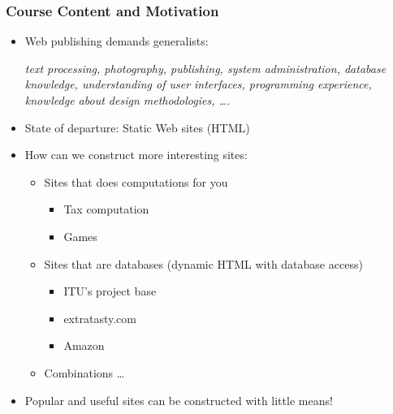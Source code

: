 \documentclass[dvipsnames]{beamer}
\begin{document}
\begin{frame}
\frametitle{Course Content and Motivation}

\begin{itemize}
\item Web publishing demands generalists:
  
  \begin{small}
      \textit{text processing, photography, publishing, system administration,
      database knowledge, understanding of user interfaces,
      programming experience, knowledge about design methodologies,
      \ldots.}
  \end{small}
\item State of departure: Static Web sites (HTML)


\item How can we construct more interesting sites:
\begin{itemize}
\item Sites that does computations for you
  \begin{itemize}
  \item Tax computation
  \item Games
  \end{itemize}
\item Sites that are databases (dynamic HTML with database access)
  \begin{itemize}
  \item ITU's project base
  \item extratasty.com
  \item Amazon 
  \end{itemize}
\item Combinations \ldots
\end{itemize}


\item Popular and useful sites can be constructed with little means!
\end{itemize}
\end{frame}
\end{document}
